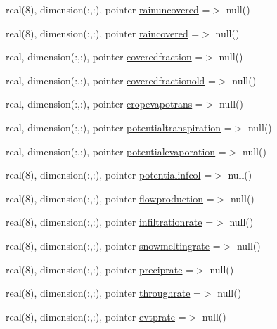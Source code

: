 \begin{DoxyCompactItemize}
real(8), dimension(\+:,\+:), pointer \mbox{\hyperlink{structmodulebasin_1_1t__basin_ab9d424e047d5990e565c403305318f79}{rainuncovered}} =$>$ null()
\item 
real(8), dimension(\+:,\+:), pointer \mbox{\hyperlink{structmodulebasin_1_1t__basin_a98c7b68b4efeb387c1852f9b16632fd1}{raincovered}} =$>$ null()
\item 
real, dimension(\+:,\+:), pointer \mbox{\hyperlink{structmodulebasin_1_1t__basin_a277f6b3a2a97dfbdcd2cd92880c38e23}{coveredfraction}} =$>$ null()
\item 
real, dimension(\+:,\+:), pointer \mbox{\hyperlink{structmodulebasin_1_1t__basin_a0fe20908ffe8f8701c5c284a9675c6a2}{coveredfractionold}} =$>$ null()
\item 
real, dimension(\+:,\+:), pointer \mbox{\hyperlink{structmodulebasin_1_1t__basin_a5ffe81b002a69081ba1a860770c65b75}{cropevapotrans}} =$>$ null()
\item 
real, dimension(\+:,\+:), pointer \mbox{\hyperlink{structmodulebasin_1_1t__basin_a1615771c551adaaa6837fba158dc1396}{potentialtranspiration}} =$>$ null()
\item 
real, dimension(\+:,\+:), pointer \mbox{\hyperlink{structmodulebasin_1_1t__basin_a6103c9b244360519a8b5b16a33f5abad}{potentialevaporation}} =$>$ null()
\item 
real(8), dimension(\+:,\+:), pointer \mbox{\hyperlink{structmodulebasin_1_1t__basin_a76f18a4d4896c771342870fa7e4c5b4c}{potentialinfcol}} =$>$ null()
\item 
real(8), dimension(\+:,\+:), pointer \mbox{\hyperlink{structmodulebasin_1_1t__basin_a41c4cc70d0207bdd34966242bcecfdbf}{flowproduction}} =$>$ null()
\item 
real(8), dimension(\+:,\+:), pointer \mbox{\hyperlink{structmodulebasin_1_1t__basin_acbf970c49103bc7a69b11b3c20e19703}{infiltrationrate}} =$>$ null()
\item 
real(8), dimension(\+:,\+:), pointer \mbox{\hyperlink{structmodulebasin_1_1t__basin_a64d8cdedb4f3da88a79a00c24d8edaad}{snowmeltingrate}} =$>$ null()
\item 
real(8), dimension(\+:,\+:), pointer \mbox{\hyperlink{structmodulebasin_1_1t__basin_aabc9188177821b4ceacd2ba868261e6e}{preciprate}} =$>$ null()
\item 
real(8), dimension(\+:,\+:), pointer \mbox{\hyperlink{structmodulebasin_1_1t__basin_a70bfbe565663dee6b450278a37ab0474}{throughrate}} =$>$ null()
\item 
real(8), dimension(\+:,\+:), pointer \mbox{\hyperlink{structmodulebasin_1_1t__basin_af5cf0fa77358dbe3229c610ae0d7c415}{evtprate}} =$>$ null()

\end{DoxyCompactItemize}
